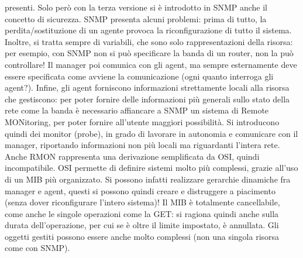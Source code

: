 presenti. Solo però con la terza versione si è introdotto in SNMP anche il
concetto di sicurezza.
SNMP presenta alcuni problemi: prima di tutto, la perdita/sostituzione di un
agente provoca la riconfigurazione di
tutto il sistema. Inoltre, si tratta sempre di variabili, che sono solo
rappresentazioni della risorsa: per esempio,
con SNMP non si può specificare la banda di un router, non la può controllare!
Il manager poi comunica con gli agent,
ma sempre esternamente deve essere specificata come avviene la comunicazione
(ogni quanto interroga gli agent?).
Infine, gli agent forniscono informazioni strettamente locali alla risorsa che
gestiscono:
per poter fornire delle informazioni più generali sullo stato della rete come la
banda è necessario affiancare a SNMP un sistema di Remote MONitoring, per poter
fornire all'utente maggiori possibilità. Si introducono quindi dei monitor
(probe), in grado di lavorare in autonomia e comunicare con il manager,
riportando informazioni non più locali ma riguardanti l'intera rete. Anche RMON
rappresenta una derivazione semplificata da OSI, quindi incompatibile.
OSI permette di definire sistemi molto più complessi, grazie all'uso di un MIB
più organizzato. Si possono infatti
realizzare gerarchie dinamiche fra manager e agent, questi si possono quindi
creare e distruggere a piacimento (senza
dover riconfigurare l'intero sistema)! Il MIB è totalmente cancellabile, come
anche le singole operazioni come la GET: si ragiona quindi anche sulla durata
dell'operazione, per cui se è oltre il limite impostato, è annullata. Gli
oggetti gestiti possono essere anche molto complessi (non una singola risorsa
come con SNMP).
